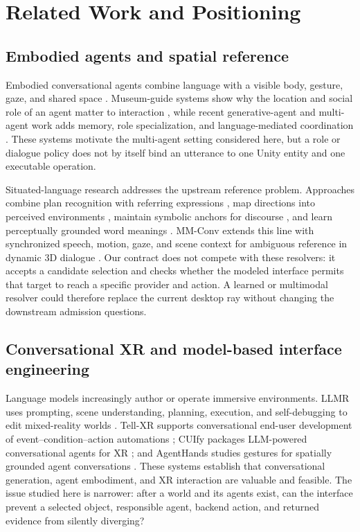 \section{Related Work and Positioning}
\label{sec:related}

\subsection{Embodied agents and spatial reference}

Embodied conversational agents combine language with a visible body, gesture,
gaze, and shared space \cite{cassell1999embodiment}.  Museum-guide systems show
why the location and social role of an agent matter to interaction
\cite{kopp2005museum,bickmore2011museum}, while recent generative-agent and
multi-agent work adds memory, role specialization, and language-mediated
coordination \cite{park2023generative,li2023camel}.  These systems motivate the
multi-agent setting considered here, but a role or dialogue policy does not by
itself bind an utterance to one Unity entity and one executable operation.

Situated-language research addresses the upstream reference problem.
Approaches combine plan recognition with referring expressions
\cite{gorniak2005grounding}, map directions into perceived environments
\cite{kollar2010directions}, maintain symbolic anchors for discourse
\cite{lemaignan2012grounding}, and learn perceptually grounded word meanings
\cite{kennington2015reference}.  MM-Conv extends this line with synchronized
speech, motion, gaze, and scene context for ambiguous reference in dynamic 3D
dialogue \cite{deichler2026mmconv}.  Our contract does not compete with these
resolvers: it accepts a candidate selection and checks whether the modeled
interface permits that target to reach a specific provider and action.  A
learned or multimodal resolver could therefore replace the current desktop ray
without changing the downstream admission questions.

\subsection{Conversational XR and model-based interface engineering}

Language models increasingly author or operate immersive environments.  LLMR
uses prompting, scene understanding, planning, execution, and self-debugging to
edit mixed-reality worlds \cite{delatorre2024llmr}.  Tell-XR supports
conversational end-user development of event--condition--action automations
\cite{carcangiu2025tellxr}; CUIfy packages LLM-powered conversational agents
for XR \cite{buldu2025cuify}; and AgentHands studies gestures for spatially
grounded agent conversations \cite{liu2026agenthands}.  These systems establish
that conversational generation, agent embodiment, and XR interaction are
valuable and feasible.  The issue studied here is narrower: after a world and
its agents exist, can the interface prevent a selected object, responsible
agent, backend action, and returned evidence from silently diverging?

